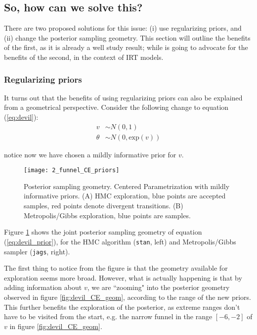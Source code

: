 
\subsection{So, how can we solve this?}

There are two proposed solutions for this issue: (i) use regularizing priors, and (ii) change the posterior sampling geometry. This section will outline the benefits of the first, as it is already a well study result; while is going to advocate for the benefits of the second, in the context of IRT models.

\subsubsection{Regularizing priors}

It turns out that the benefits of using regularizing priors can also be explained from a geometrical perspective. Consider the following change to equation (\ref{eq:devil}):
%
\begin{equation} \label{eq:devil_prior}
	\begin{split}	
		v &\sim N(0, 1) \\
		\theta &\sim N(0, \text{exp}(v))
	\end{split}
\end{equation}

\noindent notice now we have chosen a mildly informative prior for $v$. 
%
\begin{figure}[h]
	\centering
	\texttt{[image: 2\_funnel\_CE\_priors]}
	\caption[Posterior sampling geometry. Centered Parametrization with mildly informative priors.]%
	{Posterior sampling geometry. Centered Parametrization with mildly informative priors. (A) HMC exploration, blue points are accepted samples, red points denote divergent transitions. (B) Metropolis/Gibbs exploration, blue points are samples.}
	\label{fig:devil_prior_geom}
\end{figure}

Figure \ref{fig:devil_prior_geom} shows the joint posterior sampling geometry of equation (\ref{eq:devil_prior}), for the HMC algorithm (\texttt{stan}, left) and Metropolis/Gibbs sampler (\texttt{jags}, right). 

The first thing to notice from the figure is that the geometry available for exploration seems more broad. However, what is actually happening is that by adding information about $v$, we are ``zooming" into the posterior geometry observed in figure \ref{fig:devil_CE_geom}, according to the range of the new priors. This further benefits the exploration of the posterior, as extreme ranges don't have to be visited from the start, e.g. the narrow funnel in the range $[-6,-2]$ of $v$ in figure \ref{fig:devil_CE_geom}.

